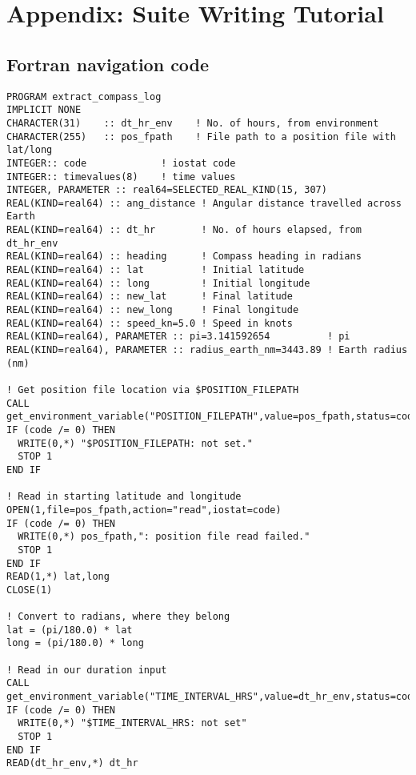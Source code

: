 \section{Appendix: Suite Writing Tutorial}
\label{Appendix Suite Writing Tutorial}


\subsection{Fortran navigation code}

\lstset{language=Fortran}
\begin{lstlisting}[columns=fullflexible,basicstyle=\small]
PROGRAM extract_compass_log
IMPLICIT NONE
CHARACTER(31)    :: dt_hr_env    ! No. of hours, from environment
CHARACTER(255)   :: pos_fpath    ! File path to a position file with lat/long
INTEGER:: code             ! iostat code
INTEGER:: timevalues(8)    ! time values
INTEGER, PARAMETER :: real64=SELECTED_REAL_KIND(15, 307)
REAL(KIND=real64) :: ang_distance ! Angular distance travelled across Earth
REAL(KIND=real64) :: dt_hr        ! No. of hours elapsed, from dt_hr_env
REAL(KIND=real64) :: heading      ! Compass heading in radians
REAL(KIND=real64) :: lat          ! Initial latitude
REAL(KIND=real64) :: long         ! Initial longitude
REAL(KIND=real64) :: new_lat      ! Final latitude
REAL(KIND=real64) :: new_long     ! Final longitude
REAL(KIND=real64) :: speed_kn=5.0 ! Speed in knots
REAL(KIND=real64), PARAMETER :: pi=3.141592654          ! pi
REAL(KIND=real64), PARAMETER :: radius_earth_nm=3443.89 ! Earth radius (nm)

! Get position file location via $POSITION_FILEPATH
CALL get_environment_variable("POSITION_FILEPATH",value=pos_fpath,status=code)
IF (code /= 0) THEN
  WRITE(0,*) "$POSITION_FILEPATH: not set."
  STOP 1
END IF

! Read in starting latitude and longitude
OPEN(1,file=pos_fpath,action="read",iostat=code)
IF (code /= 0) THEN
  WRITE(0,*) pos_fpath,": position file read failed."
  STOP 1
END IF
READ(1,*) lat,long
CLOSE(1)

! Convert to radians, where they belong
lat = (pi/180.0) * lat
long = (pi/180.0) * long

! Read in our duration input
CALL get_environment_variable("TIME_INTERVAL_HRS",value=dt_hr_env,status=code)
IF (code /= 0) THEN
  WRITE(0,*) "$TIME_INTERVAL_HRS: not set"
  STOP 1
END IF
READ(dt_hr_env,*) dt_hr


\end{lstlisting}

